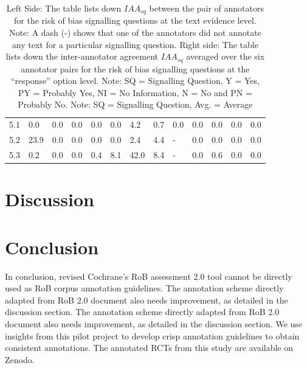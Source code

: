 \documentclass{IOS-Book-Article}
\begin{document}
\begin{table}[!ht]
\begin{tabular}{|l||l|l|l|l|l|l|l||l|l|l|l|l|}
        5.1 & 0.0 & 0.0 & 0.0 & 0.0 & 0.0 & 4.2 & 0.7 & 0.0 & 0.0 & 0.0 & 0.0 & 0.0 \\ 
        5.2 & 23.9 & 0.0 & 0.0 & 0.0 & 0.0 & 2.4 & 4.4 & - & 0.0 & 0.0 & 0.0 & 0.0 \\ 
        5.3 & 0.2 & 0.0 & 0.0 & 0.4 & 8.1 & 42.0 & 8.4 & - & 0.0 & 0.6 & 0.0 & 0.0 \\ \hline
    \end{tabular}
    \caption{\label{tab:iaa_sq_res} Left Side: The table lists down $IAA_{sq}$ between the pair of annotators for the risk of bias signalling questions at the text evidence level. Note: A dash (-) shows that one of the annotators did not annotate any text for a particular signalling question. Right side: The table lists down the inter-annotator agreement $IAA_{sq}$ averaged over the six annotator pairs for the risk of bias signalling questions at the ``response'' option level. Note: SQ = Signalling Question, Y = Yes, PY = Probably Yes, NI = No Information, N = No and PN = Probably No. Note: SQ = Signalling Question, Avg. = Average}
\end{table}

%
%
%
\section{Discussion}

\section{Conclusion}
\label{sec:conclusion}
%
In conclusion, revised Cochrane's RoB assessment 2.0 tool cannot be directly used as RoB corpus annotation guidelines.
The annotation scheme directly adapted from RoB 2.0 document also needs improvement, as detailed in the discussion section.
The annotation scheme directly adapted from RoB 2.0 document also needs improvement, as detailed in the discussion section.
We use insights from this pilot project to develop crisp annotation guidelines to obtain consistent annotations.
The annotated RCTs from this study are available on Zenodo.
%
%
%
 
%
%

%
\end{document}
